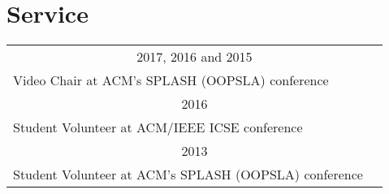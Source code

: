 \documentclass[10pt]{article}
\begin{document}
\begin{comment}
\halfblankline

\href{http://www.sikorsky.com/}{\textbf{Sikorsky Aircraft}},
New York, NY%
\begin{outerlist}

\item[] \textit{Intern, Operations Analysis}%
        \hfill \textbf{May 2007 to August 2007}
\begin{innerlist}\vspace{-4pt}
\item Lead programmer in a team creating a simulator for natural and terrorist disaster response
\end{innerlist}
\end{outerlist}
\end{comment}




\vspace{-8pt}
\section{Service}
\vspace{-10pt}
\noindent\begin{tabular}{p{2.5cm}p{10.5cm}}
\multicolumn{2}{c}{2017, 2016 and 2015}\\
Video Chair at ACM's SPLASH (OOPSLA) conference\\
\multicolumn{2}{c}{2016}\\
Student Volunteer at ACM/IEEE ICSE conference\\
\multicolumn{2}{c}{2013}\\
Student Volunteer at ACM's SPLASH (OOPSLA) conference\\
\end{tabular}\\
\vspace{10pt}
\end{document}
